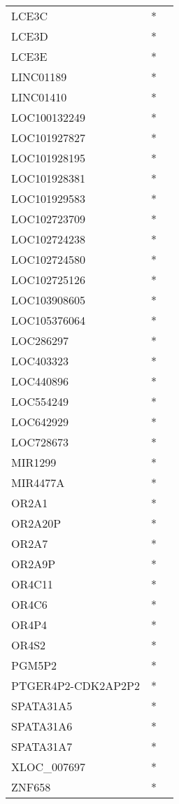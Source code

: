 \begin{tabular}{lcc}
LCE3C              &  * &         \\
LCE3D              &  * &         \\
LCE3E              &  * &         \\
LINC01189          &  * &         \\
LINC01410          &  * &         \\
LOC100132249       &  * &         \\
LOC101927827       &  * &         \\
LOC101928195       &  * &         \\
LOC101928381       &  * &         \\
LOC101929583       &  * &         \\
LOC102723709       &  * &         \\
LOC102724238       &  * &         \\
LOC102724580       &  * &         \\
LOC102725126       &  * &         \\
LOC103908605       &  * &         \\
LOC105376064       &  * &         \\
LOC286297          &  * &         \\
LOC403323          &  * &         \\
LOC440896          &  * &         \\
LOC554249          &  * &         \\
LOC642929          &  * &         \\
LOC728673          &  * &         \\
MIR1299            &  * &         \\
MIR4477A           &  * &         \\
OR2A1              &  * &         \\
OR2A20P            &  * &         \\
OR2A7              &  * &         \\
OR2A9P             &  * &         \\
OR4C11             &  * &         \\
OR4C6              &  * &         \\
OR4P4              &  * &         \\
OR4S2              &  * &         \\
PGM5P2             &  * &         \\
PTGER4P2-CDK2AP2P2 &  * &         \\
SPATA31A5          &  * &         \\
SPATA31A6          &  * &         \\
SPATA31A7          &  * &         \\
XLOC\_007697        &  * &         \\
ZNF658             &  * &         \\
\bottomrule
\end{tabular}
